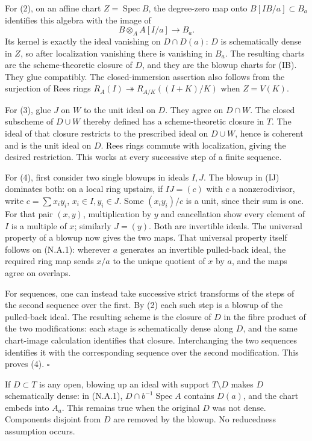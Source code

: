 \documentclass[11pt]{article}
\begin{document}
For (2), on an affine chart \(Z=\operatorname{Spec}B\), the degree-zero
map onto \(B[IB/a]\subset B_a\) identifies this algebra with the image
of \[
B\otimes_A A[I/a]\longrightarrow B_a.
\] Its kernel is exactly the ideal vanishing on \(D\cap D(a)\): \(D\) is
schematically dense in \(Z\), so after localization vanishing there is
vanishing in \(B_a\). The resulting charts are the scheme-theoretic
closure of \(D\), and they are the blowup charts for (IB). They glue
compatibly. The closed-immersion assertion also follows from the
surjection of Rees rings \(R_A(I)\twoheadrightarrow R_{A/K}((I+K)/K)\)
when \(Z=V(K)\).

For (3), glue \(J\) on \(W\) to the unit ideal on \(D\). They agree on
\(D\cap W\). The closed subscheme of \(D\cup W\) thereby defined has a
scheme-theoretic closure in \(T\). The ideal of that closure restricts
to the prescribed ideal on \(D\cup W\), hence is coherent and is the
unit ideal on \(D\). Rees rings commute with localization, giving the
desired restriction. This works at every successive step of a finite
sequence.

For (4), first consider two single blowups in ideals \(I,J\). The blowup
in (IJ) dominates both: on a local ring upstairs, if \(IJ=(c)\) with
\(c\) a nonzerodivisor, write \(c=\sum x_i y_i\), \(x_i\in I,y_i\in J\).
Some \((x_i y_i)/c\) is a unit, since their sum is one. For that pair
\((x,y)\), multiplication by \(y\) and cancellation show every element
of \(I\) is a multiple of \(x\); similarly \(J=(y)\). Both are
invertible ideals. The universal property of a blowup now gives the two
maps. That universal property itself follows on (N.A.1): wherever \(a\)
generates an invertible pulled-back ideal, the required ring map sends
\(x/a\) to the unique quotient of \(x\) by \(a\), and the maps agree on
overlaps.

For sequences, one can instead take successive strict transforms of the
steps of the second sequence over the first. By (2) each such step is a
blowup of the pulled-back ideal. The resulting scheme is the closure of
\(D\) in the fibre product of the two modifications: each stage is
schematically dense along \(D\), and the same chart-image calculation
identifies that closure. Interchanging the two sequences identifies it
with the corresponding sequence over the second modification. This
proves (4). \(\square\)

If \(D\subset T\) is any open, blowing up an ideal with support
\(T\setminus D\) makes \(D\) schematically dense: in (N.A.1),
\(D\cap b^{-1}\operatorname{Spec}A\) contains \(D(a)\), and the chart
embeds into \(A_a\). This remains true when the original \(D\) was not
dense. Components disjoint from \(D\) are removed by the blowup. No
reducedness assumption occurs.
\end{document}
